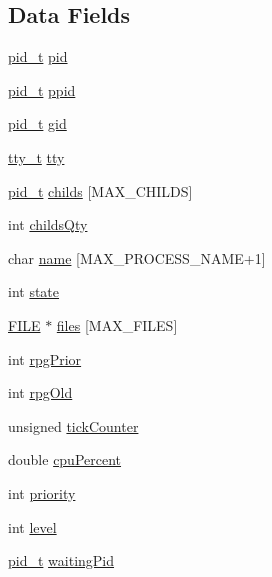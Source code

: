 \subsection*{Data Fields}
\begin{DoxyCompactItemize}
\item 
\hyperlink{types_8h_ab612a3a4eb0e2ced1e55ecff76260458}{pid\_\-t} \hyperlink{structprocess__t_ae0d46a978d5cd6707411f276ad869b9c}{pid}
\item 
\hyperlink{types_8h_ab612a3a4eb0e2ced1e55ecff76260458}{pid\_\-t} \hyperlink{structprocess__t_a812d4e1057eab93f0c388dc6c00b2cf8}{ppid}
\item 
\hyperlink{types_8h_ab612a3a4eb0e2ced1e55ecff76260458}{pid\_\-t} \hyperlink{structprocess__t_a788cbd0bbce27a8718e41d5b21806891}{gid}
\item 
\hyperlink{types_8h_a10bbb7176245baeab9f398547c410779}{tty\_\-t} \hyperlink{structprocess__t_af7f414d19241988592fad1bc470e8761}{tty}
\item 
\hyperlink{types_8h_ab612a3a4eb0e2ced1e55ecff76260458}{pid\_\-t} \hyperlink{structprocess__t_ad209165e7280e20b1fa6393e81ccca83}{childs} \mbox{[}MAX\_\-CHILDS\mbox{]}
\item 
int \hyperlink{structprocess__t_ae77317d364318c5912ead6b8114777bc}{childsQty}
\item 
char \hyperlink{structprocess__t_a69756b34768c5818fb406d341c9b3e74}{name} \mbox{[}MAX\_\-PROCESS\_\-NAME+1\mbox{]}
\item 
int \hyperlink{structprocess__t_a89f234133d3efe315836311cbf21c64b}{state}
\item 
\hyperlink{struct_f_i_l_e}{FILE} $\ast$ \hyperlink{structprocess__t_a38a7314b52579446f9acf4f643084465}{files} \mbox{[}MAX\_\-FILES\mbox{]}
\item 
int \hyperlink{structprocess__t_a3069d63842ac168171e4c2a659ac06d5}{rpgPrior}
\item 
int \hyperlink{structprocess__t_aa92db4fb120da36d4d5f60e2a8e01ce0}{rpgOld}
\item 
unsigned \hyperlink{structprocess__t_ae205502dd5c0be67092374ce83267bdf}{tickCounter}
\item 
double \hyperlink{structprocess__t_ac7aa08806d7be189514d2daaf83e5b72}{cpuPercent}
\item 
int \hyperlink{structprocess__t_acec9ce2df15222151ad66fcb1d74eb9f}{priority}
\item 
int \hyperlink{structprocess__t_acf4d33ee4cff36f69b924471174dcb11}{level}
\item 
\hyperlink{types_8h_ab612a3a4eb0e2ced1e55ecff76260458}{pid\_\-t} \hyperlink{structprocess__t_a221846b944d7ce2a181f8a1486c44d85}{waitingPid}

\end{DoxyCompactItemize}
